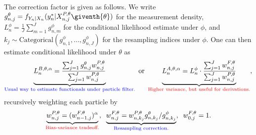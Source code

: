 \documentclass{article}
\begin{document}
The correction factor is given as follows. We write $g^{\theta}_{n,j}={f}_{{Y}_{n}|{X}_{n}}(y_{n}^{*}|{X}_{n,j}^{P,\theta}\giventh{\theta})$ for the measurement density, $L_n^{\phi} = \frac{1}{J}\sum_{m=1}^{J}g^{\phi}_{n,m}$ for the conditional likelihood estimate under $\phi$, and $k_j \sim \text{Categorical}(g^{\phi}_{n,1},...,g^{\phi}_{n,J})$ for the resampling indices under $\phi$. One can then estimate conditional likelihood under $\theta$ as
    \begin{equation}
     \label{eq:mop-conditional-likelihood}
     \underbrace{L_n^{B,\theta,\alpha} = \frac{\sum_{j=1}^Jg^\theta_{n,j} w^{P,\theta}_{n,j}}{\sum_{j=1}^J  w^{P,\theta}_{n,j}}}_{\textcolor{blue}{\text{{Usual way to estimate functionals under particle filter.}}}} \text{ or } \underbrace{L_n^{A,\theta,\alpha} = L_n^\phi\cdot \frac{\sum_{j=1}^J w^{F,\theta}_{n,j}}{\sum_{j=1}^J  w^{P,\theta}_{n,j}}}_{\textcolor{red}{\text{{Higher variance, but useful for derivations.}}}},
    \end{equation}
    recursively weighting each particle by 
    \begin{equation}
        \label{eq:weighting-scheme}
        \underbrace{w_{n,j}^{P,\theta} = (w_{n-1,j}^{F,\theta})^\alpha}_{\textcolor{red}{\text{{Bias-variance tradeoff.}}}}, \;\; \underbrace{w^{F,\theta}_{n,j} = w^{P,\theta}_{n,k_j} { g^{\theta}_{n,k_j}}/{ g^{\phi}_{n,k_j}}}_{\textcolor{blue}{\text{{Resampling correction.}}}}, \;\; w^{F,\theta}_{0,j}= 1.
    \end{equation}
\end{document}
